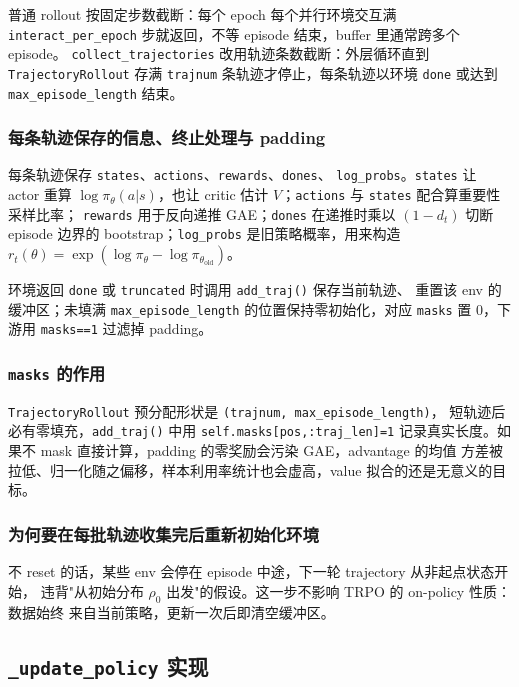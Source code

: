 \documentclass[12pt]{article}
\begin{document}
普通 rollout 按固定步数截断：每个 epoch 每个并行环境交互满 \texttt{interact\_per\_epoch}
步就返回，不等 episode 结束，buffer 里通常跨多个 episode。
\texttt{collect\_trajectories} 改用轨迹条数截断：外层循环直到
\texttt{TrajectoryRollout} 存满 \texttt{trajnum} 条轨迹才停止，每条轨迹以环境
\texttt{done} 或达到 \texttt{max\_episode\_length} 结束。

\subsubsection{每条轨迹保存的信息、终止处理与 padding}

每条轨迹保存 \texttt{states}、\texttt{actions}、\texttt{rewards}、\texttt{dones}、
\texttt{log\_probs}。\texttt{states} 让 actor 重算 $\log\pi_\theta(a|s)$，也让 critic
估计 $V$；\texttt{actions} 与 \texttt{states} 配合算重要性采样比率；
\texttt{rewards} 用于反向递推 GAE；\texttt{dones} 在递推时乘以 $(1-d_t)$ 切断 episode
边界的 bootstrap；\texttt{log\_probs} 是旧策略概率，用来构造
$r_t(\theta)=\exp(\log\pi_\theta-\log\pi_{\theta_{\mathrm{old}}})$。

环境返回 \texttt{done} 或 \texttt{truncated} 时调用 \texttt{add\_traj()} 保存当前轨迹、
重置该 env 的缓冲区；未填满 \texttt{max\_episode\_length} 的位置保持零初始化，对应
\texttt{masks} 置 0，下游用 \texttt{masks==1} 过滤掉 padding。

\subsubsection{\texttt{masks} 的作用}

\texttt{TrajectoryRollout} 预分配形状是 \texttt{(trajnum, max\_episode\_length)}，
短轨迹后必有零填充，\texttt{add\_traj()} 中用 \texttt{self.masks[pos,:traj\_len]=1}
记录真实长度。如果不 mask 直接计算，padding 的零奖励会污染 GAE，advantage 的均值
方差被拉低、归一化随之偏移，样本利用率统计也会虚高，value 拟合的还是无意义的目标。

\subsubsection{为何要在每批轨迹收集完后重新初始化环境}

不 reset 的话，某些 env 会停在 episode 中途，下一轮 trajectory 从非起点状态开始，
违背"从初始分布 $\rho_0$ 出发"的假设。这一步不影响 TRPO 的 on-policy 性质：数据始终
来自当前策略，更新一次后即清空缓冲区。

\subsection{\texttt{\_update\_policy} 实现}
\end{document}
